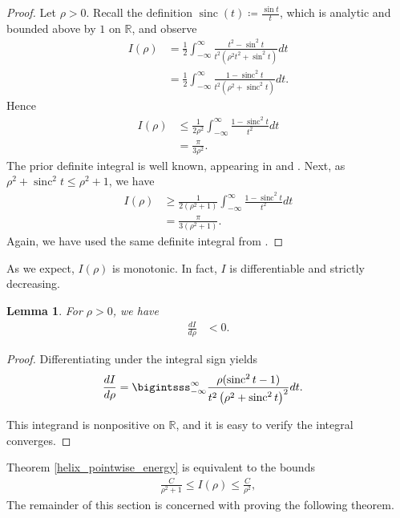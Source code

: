 \documentclass{amsart}
\theoremstyle{plain}
\numberwithin{theorem}{section}
\newtheorem{lemma}[theorem]{Lemma}
\DeclareMathOperator{\sinc}{sinc}
\theoremstyle{definition}
\theoremstyle{remark}
\theoremstyle{brakets}
\newcommand{\R}{\mathbb{R}}
\begin{document}
\begin{proof}
    Let $\rho > 0$. Recall the definition $\sinc(t) \coloneq \frac{\sin t}{t}$, which is analytic and bounded above by $1$ on $\R$, and observe
    \begin{align}
        I(\rho) &=  \frac{1}{2} \int_{-\infty}^{\infty} \frac{t^2 - \sin^2 t}{t^2\left(\rho^2t^2 + \sin^2 t\right)}dt \nonumber\\
        &= \frac{1}{2} \int_{-\infty}^{\infty} \frac{1 - \sinc^2 t}{t^2\left(\rho^2 + \sinc^2 t\right)}dt. \label{sinc_integral}
    \end{align}
Hence
\begin{align*}
    I(\rho) &\leq \frac{1}{2\rho^2} \int_{-\infty}^\infty \frac{1 - \sinc^2 t}{t^2}dt \\
    &= \frac{\pi}{3\rho^2}.
\end{align*}
The prior definite integral is well known, appearing in \cite{medhurst65} and \cite{gr07}. Next, as  $\rho^2 + \sinc^2 t \leq \rho^2 + 1$, we have
\begin{align*}
    I(\rho) &\geq \frac{1}{2 (\rho^2 + 1)} \int_{-\infty}^{\infty} \frac{1 - \sinc^2 t}{t^2}dt \\
    &= \frac{\pi}{3(\rho^2 + 1)}.
\end{align*}
Again, we have used the same definite integral from \cite{gr07}.
\end{proof}


As we expect, $I(\rho)$ is monotonic. In fact, $I$ is differentiable and strictly decreasing.

\begin{lemma}\label{Idecreasing}
    For $\rho > 0$, we have
    \begin{align*}
        \frac{dI}{d\rho} &< 0.
    \end{align*}
\end{lemma}

\begin{proof}
    Differentiating under the integral sign yields
    \begin{align*}
        \frac{dI}{d\rho} &= \bigintsss_{-\infty}^{\infty} \frac{\rho(\sinc^2 t - 1)}{t^2\left(\rho^2 + \sinc^2 t\right)^2}dt.
    \end{align*}

\noindent This integrand is nonpositive on $\R$, and it is easy to verify the integral converges.
\end{proof}

Theorem \ref{helix_pointwise_energy} is equivalent to the bounds
\begin{align}
\label{irho_estimate}
    \frac{C}{\rho^2+1} \leq I(\rho) \leq \frac{C}{\rho^2},
\end{align}
\noindent The remainder of this section is concerned with proving the following theorem.
\end{document}
